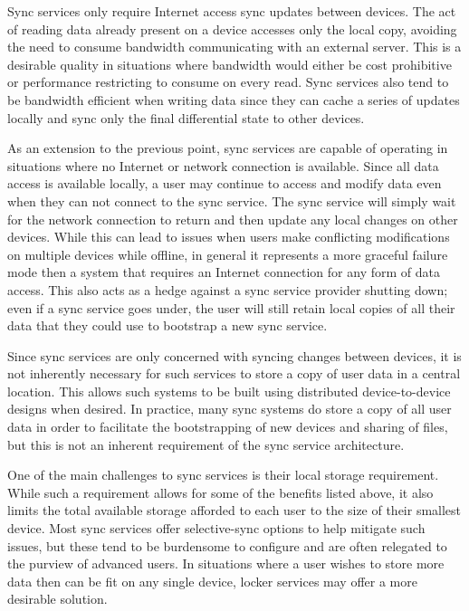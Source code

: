 \begin{packed_desc}
\item[Bandwidth Efficient:] Sync services only require Internet access
  sync updates between devices. The act of reading data already
  present on a device accesses only the local copy, avoiding the need
  to consume bandwidth communicating with an external server. This is
  a desirable quality in situations where bandwidth would either be
  cost prohibitive or performance restricting to consume on every
  read. Sync services also tend to be bandwidth efficient when writing
  data since they can cache a series of updates locally and sync only
  the final differential state to other devices.
\item[Offline Support:] As an extension to the previous point, sync
  services are capable of operating in situations where no Internet or
  network connection is available. Since all data access is available
  locally, a user may continue to access and modify data even when
  they can not connect to the sync service. The sync service will
  simply wait for the network connection to return and then update any
  local changes on other devices. While this can lead to issues when
  users make conflicting modifications on multiple devices while
  offline, in general it represents a more graceful failure mode then
  a system that requires an Internet connection for any form of data
  access. This also acts as a hedge against a sync service provider
  shutting down; even if a sync service goes under, the user will
  still retain local copies of all their data that they could use to
  bootstrap a new sync service.
\item[No Central Storage:] Since sync services are only concerned with
  syncing changes between devices, it is not inherently necessary for
  such services to store a copy of user data in a central
  location. This allows such systems to be built using distributed
  device-to-device designs when desired. In practice, many sync
  systems do store a copy of all user data in order to facilitate the
  bootstrapping of new devices and sharing of files, but this is not
  an inherent requirement of the sync service architecture.
\end{packed_desc}

One of the main challenges to sync services is their local storage
requirement. While such a requirement allows for some of the benefits
listed above, it also limits the total available storage afforded to
each user to the size of their smallest device. Most sync services
offer selective-sync options to help mitigate such issues, but these
tend to be burdensome to configure and are often relegated to the
purview of advanced users. In situations where a user wishes to store
more data then can be fit on any single device, locker services may
offer a more desirable solution.

